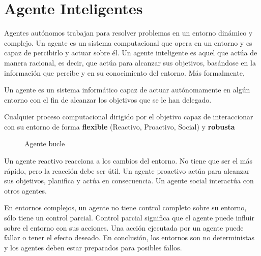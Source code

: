 \chapter{Agente Inteligentes}

Agentes autónomos trabajan para resolver problemas en un entorno dinámico y complejo. Un agente es un sistema computacional que opera en un entorno y es capaz de percibirlo y actuar sobre él. Un agente inteligente es aquel que actúa de manera racional, es decir, que actúa para alcanzar sus objetivos, basándose en la información que percibe y en su conocimiento del entorno.
Más formalmente,
\begin{definition}
   [Wooldrdige]
   Un agente es un sistema informático
   capaz de actuar autónomamente en algún
   entorno con el fin de alcanzar los objetivos
   que se le han delegado.
\end{definition}

\begin{definition}
   Cualquier proceso computacional dirigido por el objetivo capaz
   de interaccionar con su entorno de forma \textbf{flexible} (Reactivo, Proactivo, Social) y \textbf{robusta}
\end{definition}

\begin{figure}[htbp]
   \centering

   \caption{Agente bucle}
   \label{fig:agenteBucle}
\end{figure}

Un agente reactivo reacciona a los cambios del entorno. No tiene que ser el más rápido, pero la reacción debe ser útil. Un agente proactivo actúa para alcanzar sus objetivos, planifica y actúa en consecuencia. Un agente social interactúa con otros agentes.

En entornos complejos, un agente no tiene control completo sobre su entorno, sólo tiene un control parcial. Control parcial significa que el agente puede influir sobre el entorno con sus acciones. Una acción ejecutada por un agente puede fallar o tener el efecto deseado. En conclusión, los entornos son no deterministas y los agentes deben estar preparados para posibles fallos.

